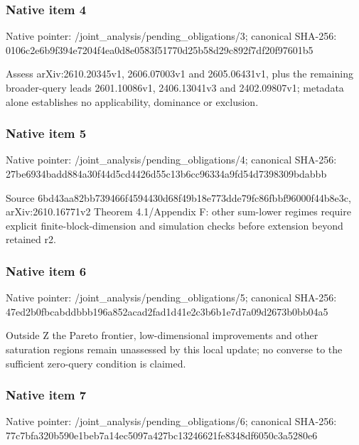 \documentclass[10pt,a4paper]{article}
\begin{document}
\subsubsection{Native item 4}
Native pointer: /joint\_\allowbreak{}analysis/pending\_\allowbreak{}obligations/3; canonical SHA-256: 0106c2e6b9f394e7204f4ea0d8e0583f51770d25b58d29c892f7df20f97601b5

\begingroup\raggedright\sloppy Assess arXiv:\allowbreak{}2610.20345v1,\allowbreak{} 2606.07003v1 and 2605.06431v1,\allowbreak{} plus the remaining broader-query leads 2601.10086v1,\allowbreak{} 2406.13041v3 and 2402.09807v1;\allowbreak{} metadata alone establishes no applicability,\allowbreak{} dominance or exclusion.\par\endgroup

\subsubsection{Native item 5}
Native pointer: /joint\_\allowbreak{}analysis/pending\_\allowbreak{}obligations/4; canonical SHA-256: 27be6934badd884a30f44d5cd4426d55c13b6cc96334a9fd54d7398309bdabbb

\begingroup\raggedright\sloppy Source 6bd43aa82bb739466f4594430d68f49b18e773dde79fc86fbbf96000f44b8e3c,\allowbreak{} arXiv:\allowbreak{}2610.16771v2 Theorem 4.1/\allowbreak{}Appendix F:\allowbreak{} other sum-lower regimes require explicit finite-block-dimension and simulation checks before extension beyond retained r2.\par\endgroup

\subsubsection{Native item 6}
Native pointer: /joint\_\allowbreak{}analysis/pending\_\allowbreak{}obligations/5; canonical SHA-256: 47ed2b0fbcabddbbb196a852acad2fad1d41e2c3b6b1e7d7a09d2673b0bb04a5

\begingroup\raggedright\sloppy Outside Z the Pareto frontier,\allowbreak{} low-dimensional improvements and other saturation regions remain unassessed by this local update;\allowbreak{} no converse to the sufficient zero-query condition is claimed.\par\endgroup

\subsubsection{Native item 7}
Native pointer: /joint\_\allowbreak{}analysis/pending\_\allowbreak{}obligations/6; canonical SHA-256: 77c7bfa320b590e1beb7a14ec5097a427bc13246621fe8348df6050c3a5280e6
\end{document}
